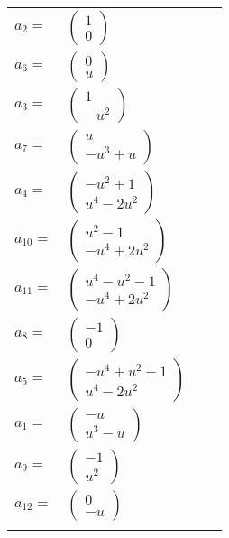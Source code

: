 \documentclass[1p]{elsarticle_modified}
\theoremstyle{definition}
\begin{document}
\begin{tabular}{m{7pt} m{180pt} m{7pt} m{180pt} }
\flushright $a_{2}=$&$\begin{pmatrix}1\\0\end{pmatrix}$ \\
\flushright $a_{6}=$&$\begin{pmatrix}0\\u\end{pmatrix}$ \\
\flushright $a_{3}=$&$\begin{pmatrix}1\\- u^2\end{pmatrix}$ \\
\flushright $a_{7}=$&$\begin{pmatrix}u\\- u^3+u\end{pmatrix}$ \\
\flushright $a_{4}=$&$\begin{pmatrix}- u^2+1\\u^4-2 u^2\end{pmatrix}$ \\
\flushright $a_{10}=$&$\begin{pmatrix}u^2-1\\- u^4+2 u^2\end{pmatrix}$ \\
\flushright $a_{11}=$&$\begin{pmatrix}u^4- u^2-1\\- u^4+2 u^2\end{pmatrix}$ \\
\flushright $a_{8}=$&$\begin{pmatrix}-1\\0\end{pmatrix}$ \\
\flushright $a_{5}=$&$\begin{pmatrix}- u^4+u^2+1\\u^4-2 u^2\end{pmatrix}$ \\
\flushright $a_{1}=$&$\begin{pmatrix}- u\\u^3- u\end{pmatrix}$ \\
\flushright $a_{9}=$&$\begin{pmatrix}-1\\u^2\end{pmatrix}$ \\
\flushright $a_{12}=$&$\begin{pmatrix}0\\- u\end{pmatrix}$\\&\end{tabular}
\end{document}
